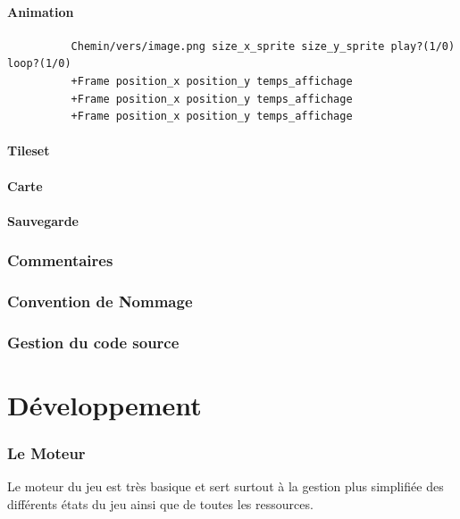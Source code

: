 \documentclass[a4paper]{article}
\newcommand{\alinea}{\hspace*{0.5cm}}
\begin{document}
      \subsection{Animation}
        \begin{verbatim}
          Chemin/vers/image.png size_x_sprite size_y_sprite play?(1/0) loop?(1/0)
          +Frame position_x position_y temps_affichage
          +Frame position_x position_y temps_affichage
          +Frame position_x position_y temps_affichage
        \end{verbatim}
      
      \subsection{Tileset}
      
      \subsection{Carte}
      
      \subsection{Sauvegarde}
      
    \section{Commentaires}
    \section{Convention de Nommage}
    \section{Gestion du code source}
		
\newpage
  \part{Développement} %
    \section{Le Moteur}
      \alinea Le moteur du jeu est très basique et sert surtout à la gestion plus simplifiée des différents états du jeu ainsi que de toutes les ressources.
      
\end{document}
